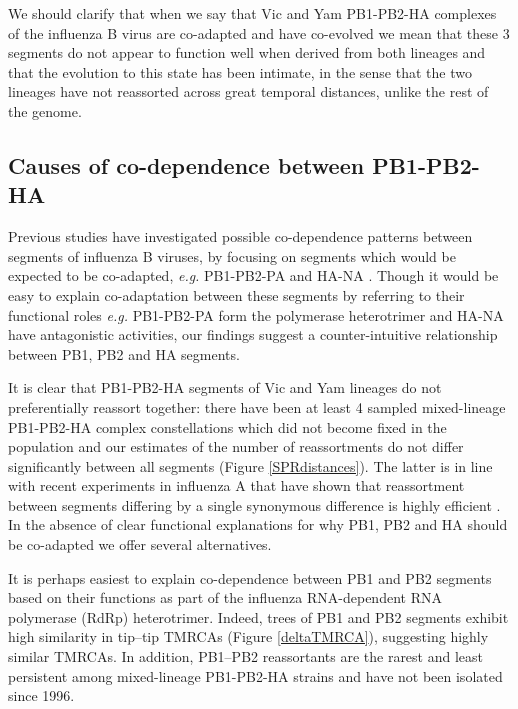 \documentclass[11pt,oneside,letterpaper]{article}
\begin{document}
We should clarify that when we say that Vic and Yam PB1-PB2-HA complexes of the influenza B virus are co-adapted and have co-evolved we mean that these 3 segments do not appear to function well when derived from both lineages and that the evolution to this state has been intimate, in the sense that the two lineages have not reassorted across great temporal distances, unlike the rest of the genome.


\subsection*{Causes of co-dependence between PB1-PB2-HA}
Previous studies have investigated possible co-dependence patterns between segments of influenza B viruses, by focusing on segments which would be expected to be co-adapted, \textit{e.g.} PB1-PB2-PA and HA-NA \citep{mccullers2004}.
Though it would be easy to explain co-adaptation between these segments by referring to their functional roles \textit{e.g.} PB1-PB2-PA form the polymerase heterotrimer and HA-NA have antagonistic activities, our findings suggest a counter-intuitive relationship between PB1, PB2 and HA segments.

It is clear that PB1-PB2-HA segments of Vic and Yam lineages do not preferentially reassort together: there have been at least 4 sampled mixed-lineage PB1-PB2-HA complex constellations which did not become fixed in the population and our estimates of the number of reassortments do not differ significantly between all segments (Figure \ref{SPRdistances}).
The latter is in line with recent experiments in influenza A that have shown that reassortment between segments differing by a single synonymous difference is highly efficient \citep{marshall2013}.
In the absence of clear functional explanations for why PB1, PB2 and HA should be co-adapted we offer several alternatives.

It is perhaps easiest to explain co-dependence between PB1 and PB2 segments based on their functions as part of the influenza RNA-dependent RNA polymerase (RdRp) heterotrimer.
Indeed, trees of PB1 and PB2 segments exhibit high similarity in tip--tip TMRCAs (Figure \ref{deltaTMRCA}), suggesting highly similar TMRCAs.
In addition, PB1--PB2 reassortants are the rarest and least persistent among mixed-lineage PB1-PB2-HA strains and have not been isolated since 1996.
\end{document}
